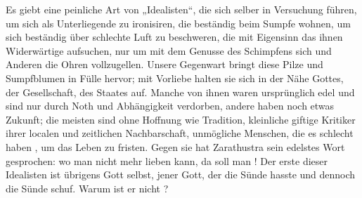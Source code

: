 Es giebt eine peinliche Art von „Idealisten“, die sich selber in Versuchung führen, um sich als Unterliegende zu ironisiren, die beständig beim Sumpfe wohnen, um sich beständig über schlechte Luft zu beschweren, die mit Eigensinn das ihnen Widerwärtige aufsuchen, nur um mit dem Genusse des Schimpfens sich und Anderen die Ohren vollzugellen. Unsere Gegenwart bringt diese Pilze und Sumpfblumen in Fülle hervor; mit Vorliebe halten sie sich in der Nähe Gottes, der Gesellschaft, des Staates auf. Manche von ihnen waren ursprünglich edel und sind nur durch Noth und Abhängigkeit verdorben, andere haben noch etwas Zukunft; die meisten sind ohne Hoffnung wie Tradition, kleinliche giftige Kritiker ihrer localen und zeitlichen Nachbarschaft, unmögliche Menschen, die es schlecht haben , um das Leben zu fristen. Gegen sie hat Zarathustra sein edelstes Wort gesprochen: wo man nicht mehr lieben kann, da soll man ! Der erste dieser Idealisten ist übrigens Gott selbst, jener Gott, der die Sünde hasste und dennoch die Sünde schuf. Warum ist er nicht ?
\par

